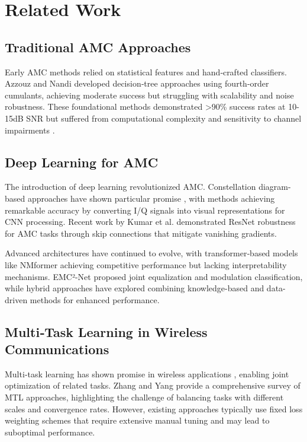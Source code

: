\documentclass{ELSP}
\begin{document}
\section{Related Work}

\subsection{Traditional AMC Approaches}
Early AMC methods relied on statistical features and hand‑crafted classifiers. Azzouz and Nandi \cite{nandi1995cumulants,azzouz1995automatic} developed decision‑tree approaches using fourth‑order cumulants, achieving moderate success but struggling with scalability and noise robustness. These foundational methods demonstrated >90\% success rates at 10-15dB SNR but suffered from computational complexity and sensitivity to channel impairments \cite{proakis2008digital}.

\subsection{Deep Learning for AMC}
The introduction of deep learning revolutionized AMC. Constellation diagram-based approaches have shown particular promise \cite{doan2020learning,kumar2020automatic}, with methods achieving remarkable accuracy by converting I/Q signals into visual representations for CNN processing. Recent work by Kumar et al. \cite{kumar2023automatic} demonstrated ResNet robustness for AMC tasks through skip connections that mitigate vanishing gradients. 

Advanced architectures have continued to evolve, with transformer‑based models like NMformer \cite{kong2023transformer,faysal2024nmformer} achieving competitive performance but lacking interpretability mechanisms. EMC²-Net \cite{ryu2023emc} proposed joint equalization and modulation classification, while hybrid approaches \cite{zheng2023toward} have explored combining knowledge-based and data-driven methods for enhanced performance.

\subsection{Multi‑Task Learning in Wireless Communications}
Multi‑task learning has shown promise in wireless applications \cite{jagannath2022multi}, enabling joint optimization of related tasks. Zhang and Yang \cite{zhang2021survey} provide a comprehensive survey of MTL approaches, highlighting the challenge of balancing tasks with different scales and convergence rates. However, existing approaches typically use fixed loss weighting schemes that require extensive manual tuning and may lead to suboptimal performance.
\end{document}
